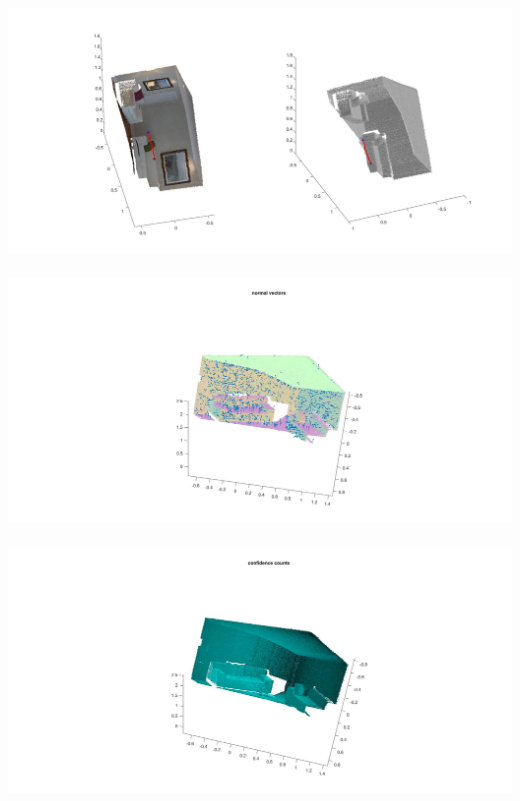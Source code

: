 \documentclass[fleqn]{article}
\begin{document}
\begin{adjustwidth}{4em}{0pt}
	\includegraphics[width = 1.25\textwidth,center]{slam_hw3_q2_d_part1_pic3.jpg}\\ \\
	\includegraphics[width = 1.5\textwidth,center]{slam_hw3_q3_partc_normalVectors.jpg}\\ \\
	\includegraphics[width = 1.5\textwidth,center]{slam_hw3_q3_partc_confidenceCounts.jpg}\\ \\

\end{adjustwidth}
\end{document}
